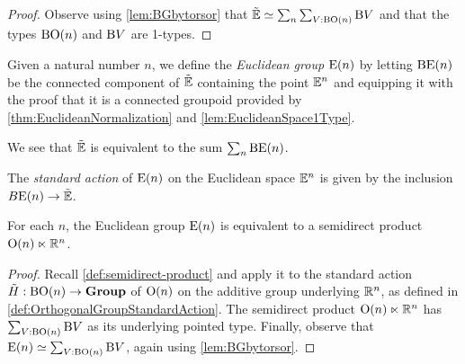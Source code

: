 \begin{proof}
  Observe using \cref{lem:BGbytorsor} that
  ${\tilde {\mathbb E}} \simeq \sum_n \sum_{V:\mathrm B \mathrm O(n)} \mathrm B V$ and that the
  types $\mathrm B \mathrm O(n)$ and $\mathrm B V$ are 1-types.
\end{proof}

\begin{definition}\label{def:EuclideanGroup}
  Given a natural number $n$, we define the {\em Euclidean group} $\mathrm E(n)$ by
  letting $\mathrm B \mathrm E(n)$ be the connected component of ${\tilde {\mathbb E}}$ containing the
  point $\mathbb E^n$ and equipping it with the proof that it is a connected
  groupoid provided by \cref{thm:EuclideanNormalization} and
  \cref{lem:EuclideanSpace1Type}.
\end{definition}

We see that ${\tilde {\mathbb E}}$ is equivalent to the sum $\sum_n \mathrm B \mathrm E(n)$.

\begin{definition}\label{def:EuclideanGroupStandardAction}
  The {\em standard action} of $\mathrm E(n)$ on the Euclidean space $\mathbb E^n$ is given
  by the inclusion $B \mathrm E(n) \to {\tilde {\mathbb E}}$.
\end{definition}

\begin{theorem}\label{thm:EuclideanGroupSemidirect}
  For each $n$, the Euclidean group $\mathrm E(n)$ is equivalent to a semidirect
  product $\mathrm O(n) \ltimes \mathbb{R}^n$.
\end{theorem}

\begin{proof}
  Recall \cref{def:semidirect-product} and apply it to the standard action
  $\tilde H : \mathrm B \mathrm O(n) \to \mathbf{Group}$ of $\mathrm O(n)$ on the additive group
  underlying $\mathbb{R}^n$, as defined in \cref{def:OrthogonalGroupStandardAction}.
  The semidirect product $\mathrm O(n) \ltimes \mathbb{R}^n$ has
  $\sum_{V:\mathrm B \mathrm O(n)} \mathrm B V$ as its underlying pointed type.
  Finally, observe that $\mathrm E(n) \simeq \sum_{V:\mathrm B \mathrm O(n)} \mathrm B V$, again
  using \cref{lem:BGbytorsor}.
\end{proof}

